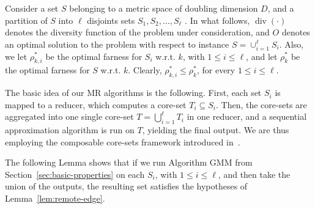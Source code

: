 \documentclass{article}
\DeclareMathOperator{\diversity}{div}
\begin{document}
Consider a set $S$ belonging to a metric space of doubling dimension
$D$, and a partition of $S$ into $\ell$ disjoints sets
$S_1, S_2, \ldots, S_{\ell}$ . In what follows, $\diversity(\cdot)$
denotes the diversity function of the problem under consideration, and
$O$ denotes an optimal solution to the problem with respect to
instance $S=\cup_{i=1}^{\ell}S_i$. Also, we let $\rho^*_{k,i}$ be the
optimal farness for $S_i$ w.r.t. $k$, with $1 \le i \le \ell$, and let
$\rho^*_k$ be the optimal farness for $S$ w.r.t. $k$.  Clearly,
$\rho^*_{k,i} \le \rho^*_k$, for every $1 \le i \le \ell$.

The basic idea of our MR algorithms is the following. First, each set
$S_i$ is mapped to a reducer, which computes a core-set
$T_i\subseteq S_i$.  Then, the core-sets are aggregated into one
single core-set $T=\bigcup_{i=1}^\ell T_i$ in one reducer, and a
sequential approximation algorithm is run on $T$, yielding the final
output.  We are thus employing the composable core-sets framework
introduced in~\cite{IndykMMM14}.

The following Lemma shows that if we run Algorithm {\sc GMM} 
from Section~\ref{sec:basic-properties} on
each $S_i$, with $1\le i\le\ell$, and then take the union of the
outputs, the resulting set satisfies the hypotheses of
Lemma~\ref{lem:remote-edge}.
\end{document}
